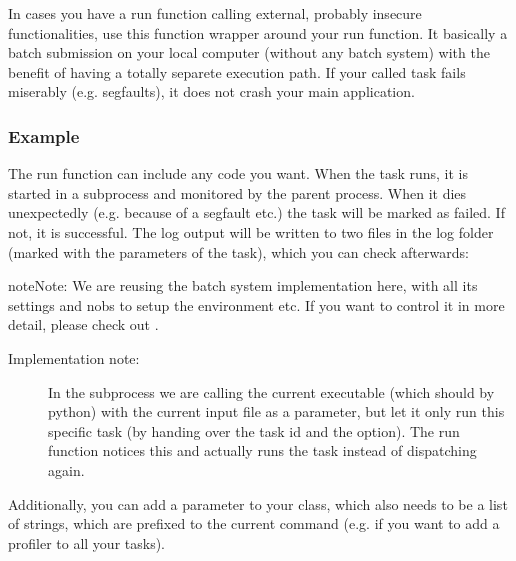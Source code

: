 \documentclass[letterpaper,10pt,english]{sphinxmanual}
\begin{document}
\begin{fulllineitems}
\label{\detokenize{documentation/api:b2luigi.dispatch}}
In cases you have a run function calling external, probably insecure functionalities,
use this function wrapper around your run function.
It basically  a batch submission on your local computer (without any
batch system) with the benefit of having a totally separete execution path.
If your called task fails miserably (e.g. segfaults), it does not crash your main application.
\subsubsection*{Example}

The run function can include any code you want. When the task runs,
it is started in a subprocess and monitored by the parent process.
When it dies unexpectedly (e.g. because of a segfault etc.)
the task will be marked as failed. If not, it is successful.
The log output will be written to two files in the log folder (marked with
the parameters of the task), which you can check afterwards:

\begin{sphinxVerbatim}[commandchars=\\\{\}]
 

 
     
\end{sphinxVerbatim}

\begin{sphinxadmonition}{note}{Note:}
We are reusing the batch system implementation here, with all its settings
and nobs to setup the environment etc.
If you want to control it in more detail, please check out {\hyperref[\detokenize{usage/batch:batch-label}]{}}.
\end{sphinxadmonition}
\begin{description}
\item[{Implementation note:}] \leavevmode
In the subprocess we are calling the current executable (which should by python)
with the current input file as a parameter, but let it only run this
specific task (by handing over the task id and the  option).
The run function notices this and actually runs the task instead of dispatching again.

\end{description}

Additionally, you can add a  parameter to your class, which also
needs to be a list of strings, which are prefixed to the current command (e.g.
if you want to add a profiler to all your tasks).

\end{fulllineitems}
\end{document}
